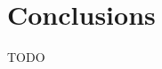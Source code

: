\documentclass[../chapters.tex]{subfiles}
\begin{document}
    \chapter{Conclusions}\label{sec:conclusions}
    TODO
\end{document}
